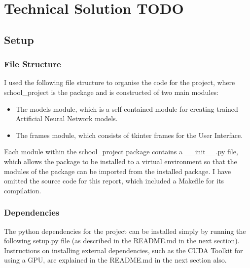 \documentclass[./project-report/src/latex/project-report.tex]{subfiles}
\begin{document}
\maketitle

\section{Technical Solution TODO}

\subsection{Setup}

\subsubsection{File Structure}

I used the following file structure to organise the code for the project, where school\_project is the package and is constructed of two main modules:

\begin{itemize}
    \item The models module, which is a self-contained module for creating trained Artificial Neural Network models.
    \item The frames module, which consists of tkinter frames for the User Interface.
\end{itemize}

Each module within the school\_project package contains a \_\_init\_\_.py file, which allows the package to be installed to a virtual environment so that the modules of the package 
can be imported from the installed package. I have omitted the source code for this report, which included a Makefile for its compilation.

\pagebreak

\begin{footnotesize}
\end{footnotesize}

\subsubsection{Dependencies}

The python dependencies for the project can be installed simply by running the following setup.py file (as described in the README.md in the next section). Instructions on 
installing external dependencies, such as the CUDA Toolkit for using a GPU, are explained in the README.md in the next section also.
\end{document}
